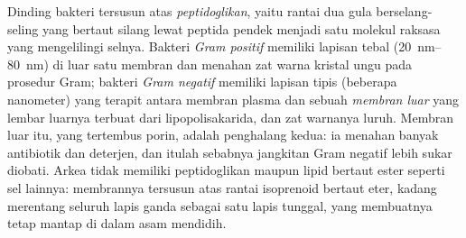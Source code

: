 \begin{proposition}\label{prop:b2:unicellular-diversity:gram}
Dinding bakteri tersusun atas \emph{peptidoglikan}, yaitu rantai dua
gula berselang-seling yang bertaut silang lewat peptida pendek menjadi
satu molekul raksasa yang mengelilingi selnya. Bakteri \emph{Gram
positif} memiliki lapisan tebal (\qtyrange{20}{80}{nm}) di luar satu
membran dan menahan zat warna kristal ungu pada prosedur Gram; bakteri
\emph{Gram negatif} memiliki lapisan tipis (beberapa nanometer) yang
terapit antara membran plasma dan sebuah \emph{membran luar} yang
lembar luarnya terbuat dari lipopolisakarida, dan zat warnanya luruh.
Membran luar itu, yang tertembus porin, adalah penghalang kedua: ia
menahan banyak antibiotik dan deterjen, dan itulah sebabnya jangkitan
Gram negatif lebih sukar diobati. Arkea tidak memiliki peptidoglikan
maupun lipid bertaut ester seperti sel lainnya: membrannya tersusun
atas rantai isoprenoid bertaut eter, kadang merentang seluruh lapis
ganda sebagai satu lapis tunggal, yang membuatnya tetap mantap di dalam
asam mendidih.
\end{proposition}

